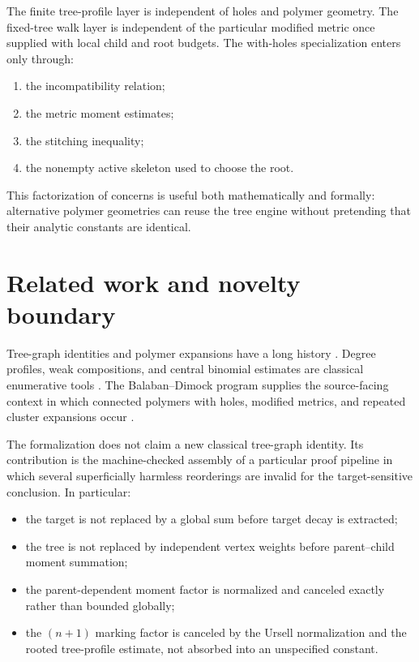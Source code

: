 \documentclass[11pt]{article}
\begin{document}
The finite tree-profile layer is independent of holes and polymer geometry.  The fixed-tree walk layer is independent of the particular modified metric once supplied with local child and root budgets.  The with-holes specialization enters only through:
\begin{enumerate}[label=(\alph*),leftmargin=2.5em]
  \item the incompatibility relation;
  \item the metric moment estimates;
  \item the stitching inequality;
  \item the nonempty active skeleton used to choose the root.
\end{enumerate}
This factorization of concerns is useful both mathematically and formally: alternative polymer geometries can reuse the tree engine without pretending that their analytic constants are identical.

\section{Related work and novelty boundary}

Tree-graph identities and polymer expansions have a long history \citep{penrose1967,brydges1986,kotecky1986,fernandez2007}.  Degree profiles, weak compositions, and central binomial estimates are classical enumerative tools \citep{stanley2012,flajolet2009}.  The Balaban--Dimock program supplies the source-facing context in which connected polymers with holes, modified metrics, and repeated cluster expansions occur \citep{dimock2011,dimock2012,dimock2013}.

The formalization does not claim a new classical tree-graph identity.  Its contribution is the machine-checked assembly of a particular proof pipeline in which several superficially harmless reorderings are invalid for the target-sensitive conclusion.  In particular:
\begin{itemize}[leftmargin=2em]
  \item the target is not replaced by a global sum before target decay is extracted;
  \item the tree is not replaced by independent vertex weights before parent--child moment summation;
  \item the parent-dependent moment factor is normalized and canceled exactly rather than bounded globally;
  \item the $(n+1)$ marking factor is canceled by the Ursell normalization and the rooted tree-profile estimate, not absorbed into an unspecified constant.
\end{itemize}
\end{document}
